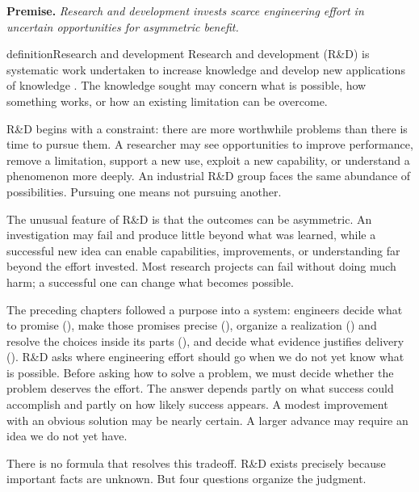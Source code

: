 \textbf{Premise.} \emph{Research and development invests scarce engineering effort in uncertain opportunities
for asymmetric benefit.}

\begin{bookbox}{definition}{Research and development} %
Research and development (R\&D) is systematic work undertaken to increase knowledge and develop new
applications of knowledge \citep{oecd2015frascati}. The knowledge sought may concern what is possible,
how something works, or how an existing limitation can be overcome.
\end{bookbox}

R\&D begins with a constraint: there are more worthwhile problems than there is time to pursue them.
A researcher may see opportunities to improve performance, remove a limitation, support a new use,
exploit a new capability, or understand a phenomenon more deeply. An industrial R\&D group faces the
same abundance of possibilities. Pursuing one means not pursuing another.

The unusual feature of R\&D is that the outcomes can be asymmetric. An investigation may fail and
produce little beyond what was learned, while a successful new idea can enable capabilities,
improvements, or understanding far beyond the effort invested. Most research projects can fail
without doing much harm; a successful one can change what becomes possible.

The preceding chapters followed a purpose into a system: engineers decide what to promise
(\citet{ch-requirements}), make those promises precise (\citet{ch-specification}), organize a realization
(\citet{ch-architecture}) and resolve the choices inside its parts (\citet{ch-design}), and decide what evidence
justifies delivery (\citet{ch-validation}). R\&D asks where engineering effort should go when we do not
yet know what is possible. Before asking how to solve a problem, we must decide
whether the problem deserves the effort. The answer depends partly on what success could accomplish
and partly on how likely success appears. A modest improvement with an obvious solution may be
nearly certain. A larger advance may require an idea we do not yet have.

There is no formula that resolves this tradeoff. R\&D exists precisely because important facts are
unknown. But four questions organize the judgment.

